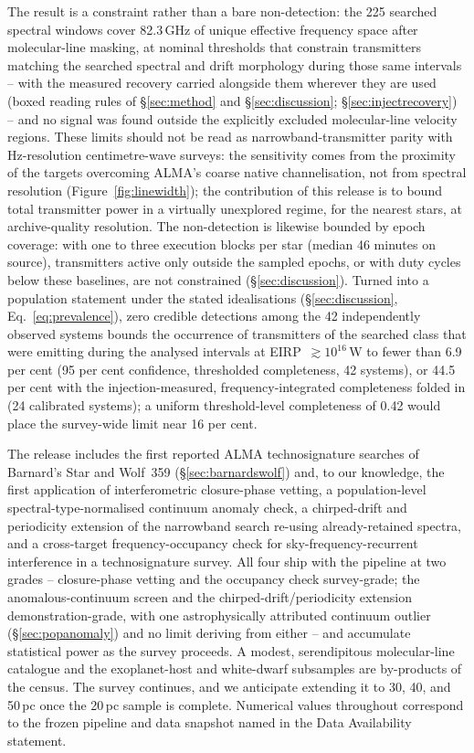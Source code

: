 \documentclass{openjournal}
\begin{document}
The result is a constraint rather than a bare non-detection: the 225
searched spectral windows cover 82.3\,GHz of unique effective
frequency space after molecular-line masking, at nominal thresholds
that constrain transmitters matching the searched spectral and drift
morphology during those same intervals -- with the measured recovery
carried alongside them wherever they are used (boxed reading rules of
\S\ref{sec:method} and \S\ref{sec:discussion};
\S\ref{sec:injectrecovery}) -- and no signal was found outside the
explicitly excluded molecular-line velocity regions. These limits
should not be read as narrowband-transmitter parity with
Hz-resolution centimetre-wave surveys: the sensitivity comes from the
proximity of the targets overcoming ALMA's coarse native
channelisation, not from spectral resolution
(Figure~\ref{fig:linewidth}); the contribution of this release is to
bound total transmitter power in a virtually unexplored regime, for
the nearest stars, at archive-quality resolution. The non-detection
is likewise bounded by epoch coverage: with one to three execution
blocks per star (median 46 minutes on source), transmitters active
only outside the sampled epochs, or with duty cycles below these
baselines, are not constrained (\S\ref{sec:discussion}). Turned into
a population statement under the stated idealisations
(\S\ref{sec:discussion}, Eq.~\ref{eq:prevalence}), zero credible
detections among the 42 independently observed systems bounds the
occurrence of transmitters of the searched class that were emitting
during the analysed intervals at EIRP~$\gtrsim10^{16}$\,W to fewer
than 6.9 per cent (95 per cent confidence, thresholded completeness,
42 systems), or 44.5 per cent with the injection-measured,
frequency-integrated completeness folded in (24 calibrated systems);
a uniform threshold-level completeness of 0.42 would place the
survey-wide limit near 16 per cent.

The release includes the first reported ALMA technosignature searches
of Barnard's Star and Wolf~359 (\S\ref{sec:barnardswolf}) and, to our
knowledge, the first application of interferometric closure-phase
vetting, a population-level spectral-type-normalised continuum
anomaly check, a chirped-drift and periodicity extension of the
narrowband search re-using already-retained spectra, and a
cross-target frequency-occupancy check for sky-frequency-recurrent
interference in a technosignature survey. All four ship with the
pipeline at two grades -- closure-phase vetting and the occupancy
check survey-grade; the anomalous-continuum screen and the
chirped-drift/periodicity extension demonstration-grade, with one
astrophysically attributed continuum outlier
(\S\ref{sec:popanomaly}) and no limit deriving from either -- and
accumulate statistical power as the survey proceeds. A modest,
serendipitous molecular-line catalogue and the exoplanet-host and
white-dwarf subsamples are by-products of the census. The survey
continues, and we anticipate extending it to 30, 40, and 50\,pc once
the 20\,pc sample is complete. Numerical values throughout
correspond to the frozen pipeline and data snapshot named in the
Data Availability statement.
\end{document}

